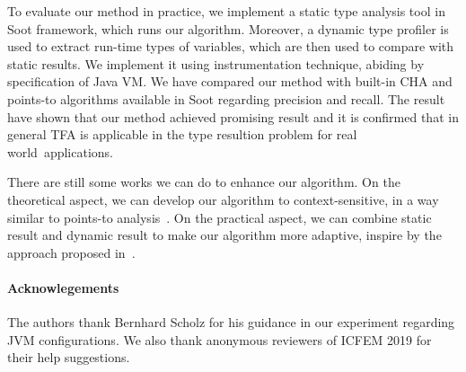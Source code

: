 \documentclass{fac}
\begin{document}
To evaluate our method in practice, we implement a static type analysis tool in Soot framework, which runs our algorithm. Moreover, a dynamic type profiler is used to extract run-time types of variables, which are then used to compare with static results. We implement it using instrumentation technique, abiding by specification of Java VM. We have compared our method with built-in CHA and points-to algorithms available in Soot regarding precision and recall. The result have shown that our method achieved promising result and it is confirmed that in general TFA is applicable in the type resultion problem for real world~applications.

There are still some works we can do to enhance our algorithm. On the theoretical aspect, we can develop our algorithm to context-sensitive, in a way similar to points-to analysis~\cite{Milanova2005,Smaragdakis11}. On the practical aspect, we can combine static result and dynamic result to make our algorithm more adaptive, inspire by the approach proposed in~\cite{Codrut2014}.

\paragraph{Acknowlegements} The authors thank Bernhard Scholz for his guidance in our experiment regarding JVM configurations. We also thank anonymous reviewers of ICFEM 2019 for their help suggestions.
\label{lastpage}



\end{document}
